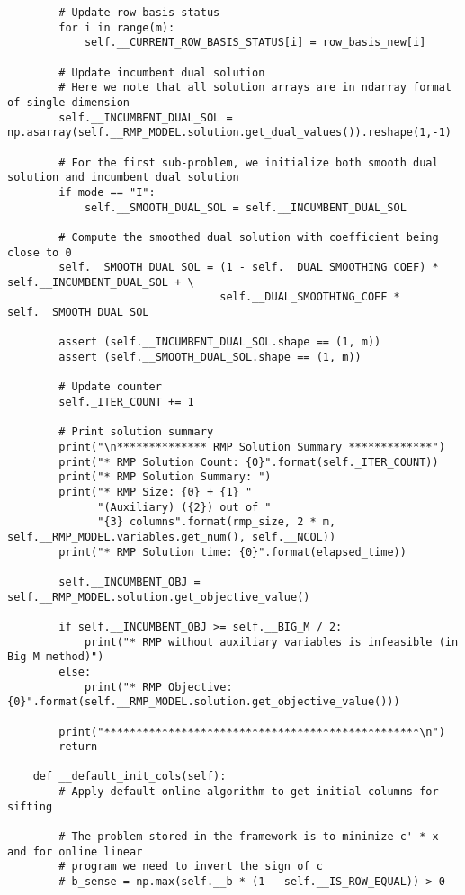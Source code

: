 \documentclass{article}
\begin{document}
\begin{lstlisting}
        # Update row basis status
        for i in range(m):
            self.__CURRENT_ROW_BASIS_STATUS[i] = row_basis_new[i]

        # Update incumbent dual solution
        # Here we note that all solution arrays are in ndarray format of single dimension
        self.__INCUMBENT_DUAL_SOL = np.asarray(self.__RMP_MODEL.solution.get_dual_values()).reshape(1,-1)

        # For the first sub-problem, we initialize both smooth dual solution and incumbent dual solution
        if mode == "I":
            self.__SMOOTH_DUAL_SOL = self.__INCUMBENT_DUAL_SOL

        # Compute the smoothed dual solution with coefficient being close to 0
        self.__SMOOTH_DUAL_SOL = (1 - self.__DUAL_SMOOTHING_COEF) * self.__INCUMBENT_DUAL_SOL + \
                                 self.__DUAL_SMOOTHING_COEF * self.__SMOOTH_DUAL_SOL

        assert (self.__INCUMBENT_DUAL_SOL.shape == (1, m))
        assert (self.__SMOOTH_DUAL_SOL.shape == (1, m))

        # Update counter
        self._ITER_COUNT += 1

        # Print solution summary
        print("\n************** RMP Solution Summary *************")
        print("* RMP Solution Count: {0}".format(self._ITER_COUNT))
        print("* RMP Solution Summary: ")
        print("* RMP Size: {0} + {1} "
              "(Auxiliary) ({2}) out of "
              "{3} columns".format(rmp_size, 2 * m, self.__RMP_MODEL.variables.get_num(), self.__NCOL))
        print("* RMP Solution time: {0}".format(elapsed_time))

        self.__INCUMBENT_OBJ = self.__RMP_MODEL.solution.get_objective_value()

        if self.__INCUMBENT_OBJ >= self.__BIG_M / 2:
            print("* RMP without auxiliary variables is infeasible (in Big M method)")
        else:
            print("* RMP Objective: {0}".format(self.__RMP_MODEL.solution.get_objective_value()))

        print("*************************************************\n")
        return

    def __default_init_cols(self):
        # Apply default online algorithm to get initial columns for sifting

        # The problem stored in the framework is to minimize c' * x and for online linear
        # program we need to invert the sign of c
        # b_sense = np.max(self.__b * (1 - self.__IS_ROW_EQUAL)) > 0


\end{lstlisting}
\end{document}
